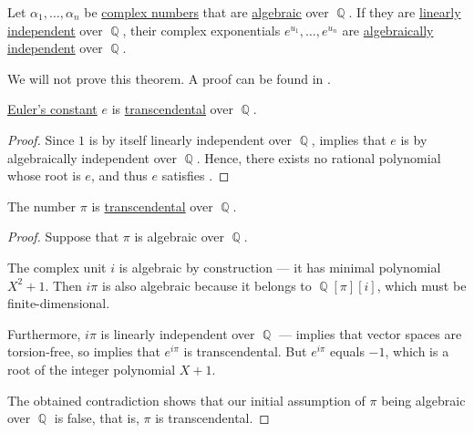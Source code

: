 \begin{theorem}\label{thm:lindemann_weierstrass}
  Let \( \alpha_1, \ldots, \alpha_n \) be \hyperref[def:complex_numbers]{complex numbers} that are \hyperref[def:algebraic_element]{algebraic} over \( \BbbQ \). If they are \hyperref[def:linear_dependence]{linearly independent} over \( \BbbQ \), their complex exponentials \( e^{u_1}, \ldots, e^{u_n} \) are \hyperref[def:algebraic_dependence]{algebraically independent} over \( \BbbQ \).
\end{theorem}
\begin{comments}
  \item We will not prove this theorem. A proof can be found in \cite[277]{Jacobson1985BasicAlgebraI}.
\end{comments}

\begin{corollary}\label{thm:eulers_constant_is_transcendental}
  \hyperref[def:exponential_function]{Euler's constant} \( e \) is \hyperref[def:transcendental_element]{transcendental} over \( \BbbQ \).
\end{corollary}
\begin{proof}
  Since \( 1 \) is by itself linearly independent over \( \BbbQ \),  implies that \( e \) is by algebraically independent over \( \BbbQ \). Hence, there exists no rational polynomial whose root is \( e \), and thus \( e \) satisfies .
\end{proof}

\begin{corollary}\label{thm:pi_is_transcendental}
  The number \hyperref[def:pi]{\( \pi \)} is \hyperref[def:transcendental_element]{transcendental} over \( \BbbQ \).
\end{corollary}
\begin{proof}
  Suppose that \( \pi \) is algebraic over \( \BbbQ \).

  The complex unit \( i \) is algebraic by construction --- it has minimal polynomial \( X^2 + 1 \). Then \( i\pi \) is also algebraic because it belongs to \( \BbbQ[\pi][i] \), which must be finite-dimensional.

  Furthermore, \( i\pi \) is linearly independent over \( \BbbQ \) ---  implies that vector spaces are torsion-free, so  implies that \( e^{i\pi} \) is transcendental. But \( e^{i\pi} \) equals \( -1 \), which is a root of the integer polynomial \( X + 1 \).

  The obtained contradiction shows that our initial assumption of \( \pi \) being algebraic over \( \BbbQ \) is false, that is, \( \pi \) is transcendental.
\end{proof}

